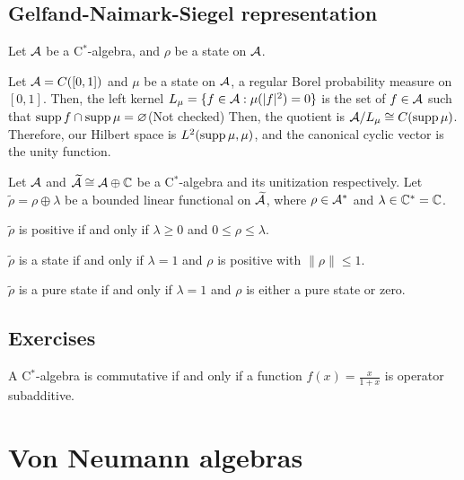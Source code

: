 \documentclass{../note}
\begin{document}
\section{Gelfand-Naimark-Siegel representation}

\begin{prb}
Let $\mathcal{A}$ be a C$^*$-algebra, and $\rho$ be a state on $\mathcal{A}$.

\end{prb}

\begin{prb}
Let $\mathcal{A}=C([0,1])$ and $\mu$ be a state on $\mathcal{A}$, a regular Borel probability measure on $[0,1]$.
Then, the left kernel $L_\mu=\{f\in\mathcal{A}:\mu(|f|^2)=0\}$ is the set of $f\in\mathcal{A}$ such that $\operatorname{supp} f\cap\operatorname{supp}\mu=\varnothing$(Not checked)
Then, the quotient is $\mathcal{A}/L_\mu\cong C(\operatorname{supp}\mu)$.
Therefore, our Hilbert space is $L^2(\operatorname{supp}\mu,\mu)$, and the canonical cyclic vector is the unity function.
\end{prb}


\begin{prb}
Let $\mathcal{A}$ and $\widetilde{\mathcal{A}}\cong\mathcal{A}\oplus\mathbb{C}$ be a C$^*$-algebra and its unitization respectively.
Let $\tilde\rho=\rho\oplus\lambda$ be a bounded linear functional on $\widetilde{\mathcal{A}}$, where $\rho\in\mathcal{A}^*$ and $\lambda\in\mathbb{C}^*=\mathbb{C}$.
\begin{parts}
\item $\tilde\rho$ is positive if and only if $\lambda\ge0$ and $0\le\rho\le\lambda$.
\item $\tilde\rho$ is a state if and only if $\lambda=1$ and $\rho$ is positive with $\|\rho\|\le1$.
\item $\tilde\rho$ is a pure state if and only if $\lambda=1$ and $\rho$ is either a pure state or zero.
\end{parts}
\end{prb}


\section*{Exercises}

\begin{prb}
A C$^*$-algebra is commutative if and only if a function $f(x)=\frac x{1+x}$ is operator subadditive.
\end{prb}





\chapter{Von Neumann algebras}
\end{document}

